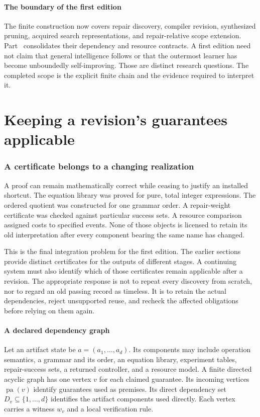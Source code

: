 \documentclass[11pt,letterpaper]{article}
\theoremstyle{plain}
\theoremstyle{definition}
\begin{document}
\subsection{The boundary of the first edition}
The finite construction now covers repair discovery, compiler revision, synthesized pruning, acquired search representations, and repair-relative scope extension. Part~\ref{part:release-contract} consolidates their dependency and resource contracts. A first edition need not claim that general intelligence follows or that the outermost learner has become unboundedly self-improving. Those are distinct research questions. The completed scope is the explicit finite chain and the evidence required to interpret it.

\clearpage\part{Keeping a revision's guarantees applicable}\label{part:release-contract}
\section{A certificate belongs to a changing realization}\label{sec:certificate-life}
A proof can remain mathematically correct while ceasing to justify an installed shortcut. The equation library was proved for pure, total integer expressions. The ordered quotient was constructed for one grammar order. A repair-weight certificate was checked against particular success sets. A resource comparison assigned costs to specified events. None of those objects is licensed to retain its old interpretation after every component bearing the same name has changed.

This is the final integration problem for the first edition. The earlier sections provide distinct certificates for the outputs of different stages. A continuing system must also identify which of those certificates remain applicable after a revision. The appropriate response is not to repeat every discovery from scratch, nor to regard an old passing record as timeless. It is to retain the actual dependencies, reject unsupported reuse, and recheck the affected obligations before relying on them again.

\subsection{A declared dependency graph}
Let an artifact state be $a=(a_1,\ldots,a_d)$. Its components may include operation semantics, a grammar and its order, an equation library, experiment tables, repair-success sets, a returned controller, and a resource model. A finite directed acyclic graph has one vertex $v$ for each claimed guarantee. Its incoming vertices $\operatorname{pa}(v)$ identify guarantees used as premises. Its direct dependency set $D_v\subseteq\{1,\ldots,d\}$ identifies the artifact components used directly. Each vertex carries a witness $w_v$ and a local verification rule.
\end{document}
